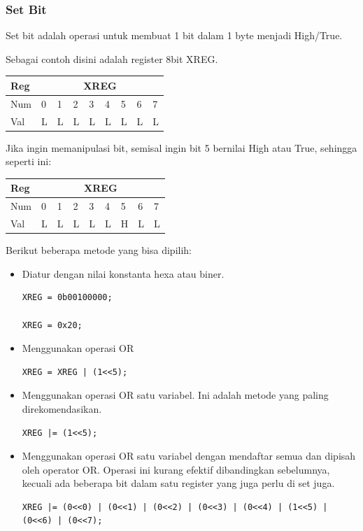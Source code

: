 \documentclass[12pt,]{article}
\begin{document}
	\subsubsection{Set Bit}

	Set bit adalah operasi untuk membuat 1 bit dalam 1 byte menjadi High/True.

	Sebagai contoh disini adalah register 8bit XREG.

	\begin{table}[H]
		\begin{tabular}{|l|l|l|l|l|l|l|l|l|}
			\hline
			Reg & \multicolumn{8}{c|}{XREG}     \\ \hline
			Num & 0 & 1 & 2 & 3 & 4 & 5 & 6 & 7 \\ \hline
			Val & L & L & L & L & L & L & L & L \\ \hline
		\end{tabular}
	\end{table}


	Jika ingin memanipulasi bit, semisal ingin bit 5 bernilai High atau True, sehingga seperti ini:
	\begin{table}[H]
		\begin{tabular}{|l|l|l|l|l|l|l|l|l|}
			\hline
			Reg & \multicolumn{8}{c|}{XREG}     \\ \hline
			Num & 0 & 1 & 2 & 3 & 4 & 5 & 6 & 7 \\ \hline
			Val & L & L & L & L & L & H & L & L \\ \hline
		\end{tabular}
	\end{table}

	Berikut beberapa metode yang bisa dipilih:
	\begin{itemize}
		\item Diatur dengan nilai konstanta hexa atau biner.
		\begin{verbatim}
XREG = 0b00100000;

XREG = 0x20;
		\end{verbatim}

		\item Menggunakan operasi OR
		\begin{verbatim}
XREG = XREG | (1<<5);
		\end{verbatim}

		\item Menggunakan operasi OR satu variabel.
		Ini adalah metode yang paling direkomendasikan.
		\begin{verbatim}
XREG |= (1<<5);
		\end{verbatim}

		\item Menggunakan operasi OR satu variabel dengan mendaftar semua dan dipisah oleh operator OR.
		Operasi ini kurang efektif dibandingkan sebelumnya,
		kecuali ada beberapa bit dalam satu register yang juga perlu di set juga.
		\begin{verbatim}
XREG |= (0<<0) | (0<<1) | (0<<2) | (0<<3) | (0<<4) | (1<<5) | (0<<6) | (0<<7);
		\end{verbatim}
	\end{itemize}
\end{document}
